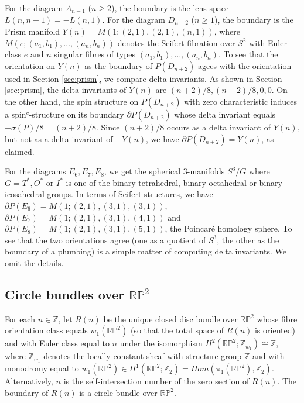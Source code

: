 \documentclass{amsart}
\theoremstyle{definition}
\theoremstyle{remark}
\numberwithin{equation}{section}
\begin{document}
For the diagram $A_{n-1}$ ($n \ge 2$), the boundary is the lens space $L(n,n-1) = -L(n,1)$. For the diagram $D_{n+2}$ ($n \ge 1$), the boundary is the Prism manifold $Y(n) = M(1 ; (2,1) , (2,1) , (n,1))$, where $M(e ; (a_1,b_1) , \dots , (a_n,b_n))$ denotes the Seifert fibration over $S^2$ with Euler class $e$ and $n$ singular fibres of types $(a_1,b_1), \dots , (a_n,b_n)$. To see that the orientation on $Y(n)$ as the boundary of $P(D_{n+2})$ agees with the orientation used in Section \ref{sec:prism}, we compare delta invariants. As shown in Section \ref{sec:prism}, the delta invariants of $Y(n)$ are $(n+2)/8, (n-2)/8, 0 , 0$. On the other hand, the spin structure on $P(D_{n+2})$ with zero characteristic induces a spin$^c$-structure on its boundary $\partial P(D_{n+2})$ whose delta invariant equals $-\sigma(P)/8 = (n+2)/8$. Since $(n+2)/8$ occurs as a delta invariant of $Y(n)$, but not as a delta invariant of $-Y(n)$, we have $\partial P(D_{n+2}) = Y(n)$, as claimed.

For the diagrams $E_6,E_7,E_8$, we get the spherical $3$-manifolds $S^3/G$ where $G = T^*, O^*$ or $I^*$ is one of the binary tetrahedral, binary octahedral or binary icosahedral groups. In terms of Seifert structures, we have $\partial P(E_6) = M(1 ; (2,1) , (3,1) , (3,1))$, $\partial P(E_7) = M(1 ; (2,1) , (3,1) , (4,1))$ and $\partial P(E_8) = M(1 ; (2,1) , (3,1) , (5,1) )$, the Poincar\'e homology sphere. To see that the two orientations agree (one as a quotient of $S^3$, the other as the boundary of a plumbing) is a simple matter of computing delta invariants. We omit the details.

\subsection{Circle bundles over $\mathbb{RP}^2$}

For each $n \in \mathbb{Z}$, let $R(n)$ be the unique closed disc bundle over $\mathbb{RP}^2$ whose fibre orientation class equals $w_1(\mathbb{RP}^2)$ (so that the total space of $R(n)$ is oriented) and with Euler class equal to $n$ under the isomorphism $H^2( \mathbb{RP}^2 ; \mathbb{Z}_{w_1} ) \cong \mathbb{Z}$, where $\mathbb{Z}_{w_1}$ denotes the locally constant sheaf with structure group $\mathbb{Z}$ and with monodromy equal to $w_1(\mathbb{RP}^2) \in H^1( \mathbb{RP}^2 ; \mathbb{Z}_2) = Hom( \pi_1(\mathbb{RP}^2) , \mathbb{Z}_2)$. Alternatively, $n$ is the self-intersection number of the zero section of $R(n)$. The boundary of $R(n)$ is a circle bundle over $\mathbb{RP}^2$.
\end{document}
